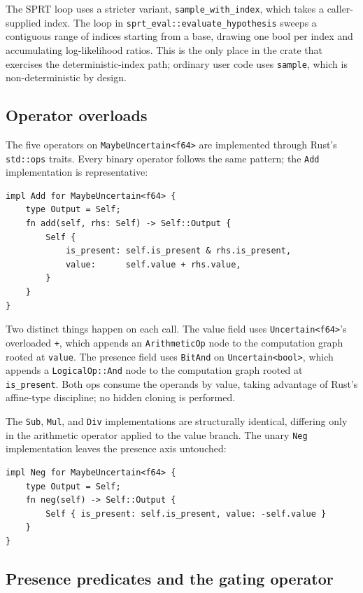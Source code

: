 The SPRT loop uses a stricter variant, \texttt{sample\_with\_index}, which
takes a caller-supplied index. The loop in
\texttt{sprt\_eval::evaluate\_hypothesis} sweeps a contiguous range of
indices starting from a base, drawing one bool per index and accumulating
log-likelihood ratios. This is the only place in the crate that exercises
the deterministic-index path; ordinary user code uses \texttt{sample},
which is non-deterministic by design.

\subsection{Operator overloads}
\label{sec:impl:ops}

The five operators on \texttt{MaybeUncertain<f64>} are implemented through
Rust's \texttt{std::ops} traits. Every binary operator follows the same
pattern; the \texttt{Add} implementation is representative:

\begin{lstlisting}
impl Add for MaybeUncertain<f64> {
    type Output = Self;
    fn add(self, rhs: Self) -> Self::Output {
        Self {
            is_present: self.is_present & rhs.is_present,
            value:      self.value + rhs.value,
        }
    }
}
\end{lstlisting}

Two distinct things happen on each call. The value field uses
\texttt{Uncertain<f64>}'s overloaded \texttt{+}, which appends an
\texttt{ArithmeticOp} node to the computation graph rooted at
\texttt{value}. The presence field uses \texttt{BitAnd} on
\texttt{Uncertain<bool>}, which appends a \texttt{LogicalOp::And} node to
the computation graph rooted at \texttt{is\_present}. Both ops consume the
operands by value, taking advantage of Rust's affine-type discipline; no
hidden cloning is performed.

The \texttt{Sub}, \texttt{Mul}, and \texttt{Div} implementations are
structurally identical, differing only in the arithmetic operator applied
to the value branch. The unary \texttt{Neg} implementation leaves the
presence axis untouched:

\begin{lstlisting}
impl Neg for MaybeUncertain<f64> {
    type Output = Self;
    fn neg(self) -> Self::Output {
        Self { is_present: self.is_present, value: -self.value }
    }
}
\end{lstlisting}

\subsection{Presence predicates and the gating operator}
\label{sec:impl:lift}

